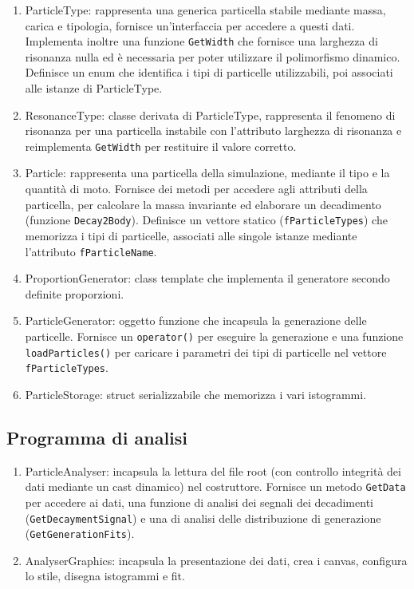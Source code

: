 \documentclass[12pt, a4paper]{article}
\begin{document}
\begin{enumerate}
\item ParticleType: rappresenta una generica particella stabile mediante massa, carica e tipologia, fornisce un'interfaccia per accedere a questi dati. Implementa inoltre una funzione \verb!GetWidth! che fornisce una larghezza di risonanza nulla ed è necessaria per poter utilizzare il polimorfismo dinamico. 
Definisce un enum che identifica i tipi di particelle utilizzabili, poi associati alle istanze di ParticleType.

\item ResonanceType: classe derivata di ParticleType, rappresenta il fenomeno di risonanza per una particella instabile con l'attributo larghezza di risonanza e reimplementa \verb!GetWidth! per restituire il valore corretto. 

\item Particle: rappresenta una particella della simulazione, mediante il tipo e la quantità di moto. 
Fornisce dei metodi per accedere agli attributi della particella, per calcolare la massa invariante ed elaborare un decadimento (funzione \verb!Decay2Body!).
Definisce un vettore statico (\verb!fParticleTypes!) che memorizza i tipi di particelle, associati alle singole istanze mediante l'attributo \verb!fParticleName!.

\item ProportionGenerator: class template che implementa il generatore secondo definite proporzioni. 
\item ParticleGenerator: oggetto funzione che incapsula la generazione delle particelle. 
Fornisce un \verb!operator()! per eseguire la generazione e una funzione \verb!loadParticles()! per caricare i parametri dei tipi di particelle nel vettore \verb!fParticleTypes!.

\item ParticleStorage: struct serializzabile che memorizza i vari istogrammi. 

\end{enumerate}

\subsection{Programma di analisi}

\begin{enumerate}
\item ParticleAnalyser: incapsula la lettura del file root (con controllo integrità dei dati mediante un cast dinamico) nel costruttore. Fornisce un metodo \verb!GetData! per accedere ai dati, una funzione di analisi dei segnali dei decadimenti (\verb!GetDecaymentSignal!) e una di analisi delle distribuzione di generazione (\verb!GetGenerationFits!). 

\item AnalyserGraphics: incapsula la presentazione dei dati, crea i canvas, configura lo stile, disegna istogrammi e fit.


\end{enumerate}
\end{document}
